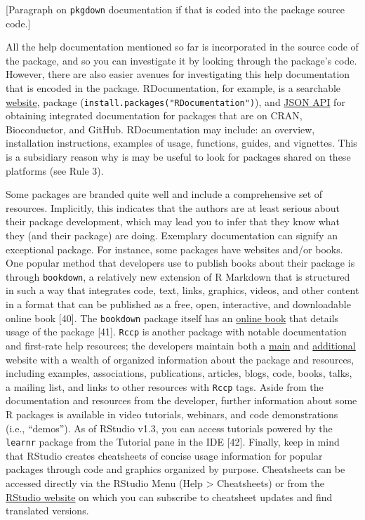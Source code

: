 \documentclass[10pt,letterpaper]{article}
\begin{document}
{[}Paragraph on \texttt{pkgdown} documentation if that is coded into the
package source code.{]}

All the help documentation mentioned so far is incorporated in the
source code of the package, and so you can investigate it by looking
through the package's code. However, there are also easier avenues for
investigating this help documentation that is encoded in the package.
RDocumentation, for example, is a searchable
\href{https://www.rdocumentation.org/}{website}, package
(\texttt{install.packages("RDocumentation")}), and
\href{https://www.rdocumentation.org/docs/}{JSON API} for obtaining
integrated documentation for packages that are on CRAN, Bioconductor,
and GitHub. RDocumentation may include: an overview, installation
instructions, examples of usage, functions, guides, and vignettes. This
is a subsidiary reason why is may be useful to look for packages shared
on these platforms (see Rule 3).

Some packages are branded quite well and include a comprehensive set of
resources. Implicitly, this indicates that the authors are at least
serious about their package development, which may lead you to infer
that they know what they (and their package) are doing. Exemplary
documentation can signify an exceptional package. For instance, some
packages have websites and/or books. One popular method that developers
use to publish books about their package is through \texttt{bookdown}, a
relatively new extension of R Markdown that is structured in such a way
that integrates code, text, links, graphics, videos, and other content
in a format that can be published as a free, open, interactive, and
downloadable online book {[}40{]}. The \texttt{bookdown} package itself
has an \href{https://bookdown.org/yihui/bookdown/}{online book} that
details usage of the package {[}41{]}. \texttt{Rccp} is another package
with notable documentation and first-rate help resources; the developers
maintain both a \href{http://www.rcpp.org/}{main} and
\href{http://dirk.eddelbuettel.com/code/rcpp.html}{additional} website
with a wealth of organized information about the package and resources,
including examples, associations, publications, articles, blogs, code,
books, talks, a mailing list, and links to other resources with
\texttt{Rccp} tags. Aside from the documentation and resources from the
developer, further information about some R packages is available in
video tutorials, webinars, and code demonstrations (i.e., ``demos''). As
of RStudio v1.3, you can access tutorials powered by the \texttt{learnr}
package from the Tutorial pane in the IDE {[}42{]}. Finally, keep in
mind that RStudio creates cheatsheets of concise usage information for
popular packages through code and graphics organized by purpose.
Cheatsheets can be accessed directly via the RStudio Menu (Help
\textgreater{} Cheatsheets) or from the
\href{https://rstudio.com/resources/cheatsheets/}{RStudio website} on
which you can subscribe to cheatsheet updates and find translated
versions.
\end{document}
